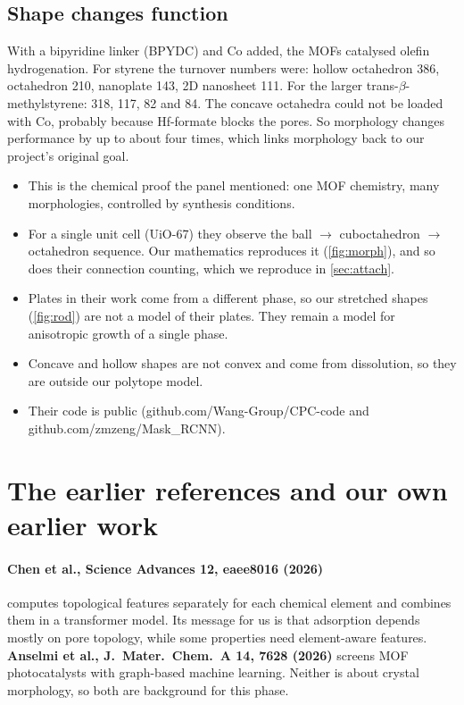 \documentclass[11pt,a4paper]{article}
\theoremstyle{remark}\newtheorem*{example}{Worked example}
\begin{document}
\subsection{Shape changes function}
With a bipyridine linker (BPYDC) and Co added, the MOFs catalysed olefin hydrogenation. For styrene the turnover numbers were: hollow octahedron 386, octahedron 210, nanoplate 143, 2D nanosheet 111. For the larger trans-$\beta$-methylstyrene: 318, 117, 82 and 84. The concave octahedra could not be loaded with Co, probably because Hf-formate blocks the pores. So morphology changes performance by up to about four times, which links morphology back to our project's original goal.

\begin{forus}
\begin{itemize}
\item This is the chemical proof the panel mentioned: one MOF chemistry, many morphologies, controlled by synthesis conditions.
\item For a single unit cell (UiO-67) they observe the ball $\to$ cuboctahedron $\to$ octahedron sequence. Our mathematics reproduces it (\autoref{fig:morph}), and so does their connection counting, which we reproduce in \autoref{sec:attach}.
\item Plates in their work come from a different phase, so our stretched shapes (\autoref{fig:rod}) are not a model of their plates. They remain a model for anisotropic growth of a single phase.
\item Concave and hollow shapes are not convex and come from dissolution, so they are outside our polytope model.
\item Their code is public (github.com/Wang-Group/CPC-code and github.com/zmzeng/Mask\_RCNN).
\end{itemize}
\end{forus}

\section{The earlier references and our own earlier work}

\paragraph{Chen et al., Science Advances 12, eaee8016 (2026)} computes topological features separately for each chemical element and combines them in a transformer model. Its message for us is that adsorption depends mostly on pore topology, while some properties need element-aware features. \textbf{Anselmi et al., J.\ Mater.\ Chem.\ A 14, 7628 (2026)} screens MOF photocatalysts with graph-based machine learning. Neither is about crystal morphology, so both are background for this phase.
\end{document}
